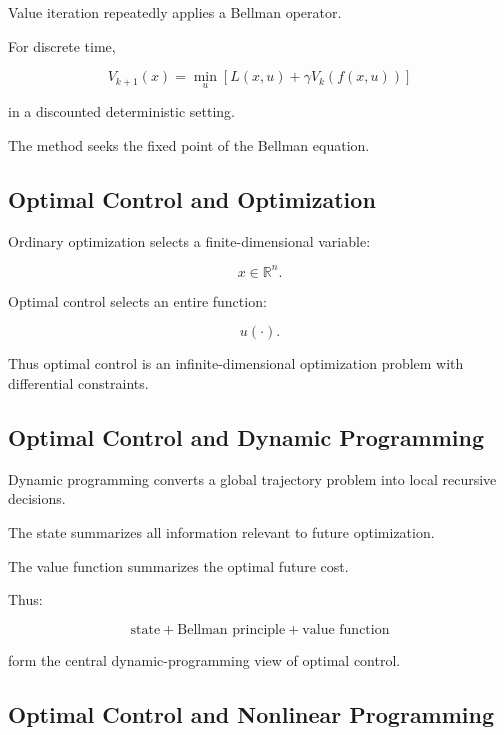 Value iteration repeatedly applies a Bellman operator.

For discrete time,

\[
\boxed{
V_{k+1}(x)
=
\min_u
\left[
L(x,u)
+
\gamma
V_k
(
f(x,u)
)
\right]
}
\]

in a discounted deterministic setting.

The method seeks the fixed point of the Bellman equation.

\subsection{Optimal Control and Optimization}
\label{subsec:optimal-control-optimization-connection}

Ordinary optimization selects a finite-dimensional variable:

\[
\boxed{
x\in\mathbb{R}^n.
}
\]

Optimal control selects an entire function:

\[
\boxed{
u(\cdot).
}
\]

Thus optimal control is an infinite-dimensional optimization problem with
differential constraints.

\subsection{Optimal Control and Dynamic Programming}
\label{subsec:optimal-control-dp-connection}

Dynamic programming converts a global trajectory problem into local
recursive decisions.

The state summarizes all information relevant to future optimization.

The value function summarizes the optimal future cost.

Thus:

\[
\boxed{
\text{state}
+
\text{Bellman principle}
+
\text{value function}
}
\]

form the central dynamic-programming view of optimal control.

\subsection{Optimal Control and Nonlinear Programming}
\label{subsec:optimal-control-nlp-connection}

